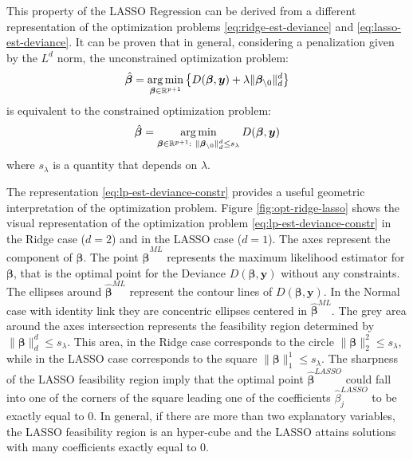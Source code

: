 \documentclass[a4paper, nobind]{templates/ociamthesis}
\theoremstyle{definition}
\theoremstyle{definition}
\theoremstyle{definition}
\theoremstyle{remark}
\begin{document}
This property of the LASSO Regression can be derived from a different representation of the optimization problems \eqref{eq:ridge-est-deviance} and \eqref{eq:lasso-est-deviance}. It can be proven that in general, considering a penalization given by the \(L^d\) norm, the unconstrained optimization problem:
\begin{equation}
\label{eq:ld-est-deviance}
\hat{\boldsymbol{\beta}} = \operatorname*{arg\,min}_{\boldsymbol{\beta}\in\mathbb{R}^{p+1}}{\left\{D(\boldsymbol{\beta}, \boldsymbol{y}) + \lambda \|\boldsymbol{\beta}_{\setminus0}\|_d^d\right\}}
\end{equation}
is equivalent to the constrained optimization problem:
\begin{equation}
\label{eq:lp-est-deviance-constr}
\hat{\boldsymbol{\beta}} = \operatorname*{arg\,min}_{\boldsymbol{\beta}\in\mathbb{R}^{p+1}:\  \|\boldsymbol{\beta}_{\setminus0}\|_d^d \le s_{\lambda}}{ D(\boldsymbol{\beta}, \boldsymbol{y}) }
\end{equation}
where \(s_{\lambda}\) is a quantity that depends on \(\lambda\).

The representation \eqref{eq:lp-est-deviance-constr} provides a useful geometric interpretation of the optimization problem. Figure \ref{fig:opt-ridge-lasso} shows the visual representation of the optimization problem \eqref{eq:lp-est-deviance-constr} in the Ridge case (\(d=2\)) and in the LASSO case (\(d=1\)). The axes represent the component of \(\boldsymbol{\beta}\). The point \(\hat{\boldsymbol{\beta}}^{ML}\) represents the maximum likelihood estimator for \(\boldsymbol{\beta}\), that is the optimal point for the Deviance \(D(\boldsymbol{\beta}, \boldsymbol{y})\) without any constraints. The ellipses around \(\hat{\boldsymbol{\beta}}^{ML}\) represent the contour lines of \(D(\boldsymbol{\beta}, \boldsymbol{y})\). In the Normal case with identity link they are concentric ellipses centered in \(\hat{\boldsymbol{\beta}}^{ML}\). The grey area around the axes intersection represents the feasibility region determined by \(\|\boldsymbol{\beta}\|_d^d \le s_\lambda\). This area, in the Ridge case corresponds to the circle \(\|\boldsymbol{\beta}\|_2^2 \le s_\lambda\), while in the LASSO case corresponds to the square \(\|\boldsymbol{\beta}\|_1^1 \le s_\lambda\). The sharpness of the LASSO feasibility region imply that the optimal point \(\hat{\boldsymbol{\beta}}^{LASSO}\) could fall into one of the corners of the square leading one of the coefficients \(\hat{\beta}_j^{LASSO}\) to be exactly equal to \(0\). In general, if there are more than two explanatory variables, the LASSO feasibility region is an hyper-cube and the LASSO attains solutions with many coefficients exactly equal to \(0\).
\end{document}
